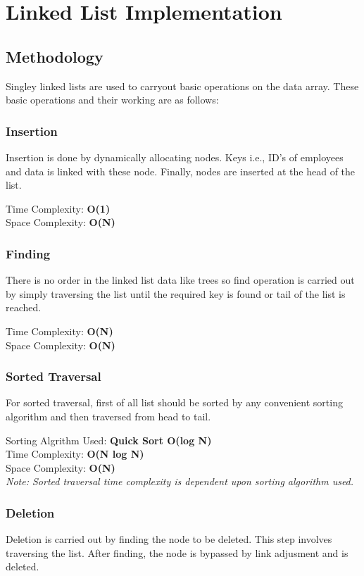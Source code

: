 \chapter{Linked List Implementation} %
\label{Chapter5}
\section{Methodology}
Singley linked lists are used to carryout basic operations on the data array. These basic operations and their working are as follows:

\subsection{Insertion}
Insertion is done by dynamically allocating nodes. Keys i.e., ID's of employees and data is linked with these node. Finally, nodes are inserted at the head of the list.

Time Complexity: \textbf{O(1)} \\
Space Complexity: \textbf{O(N)}

\subsection{Finding}
There is no order in the linked list data like trees so find operation is carried out by simply traversing the list until the required key is found or tail of the list is reached.

Time Complexity: \textbf{O(N)} \\
Space Complexity: \textbf{O(N)}

\subsection{Sorted Traversal}
For sorted traversal, first of all list should be sorted by any convenient sorting algorithm and then traversed from head to tail.

Sorting Algrithm Used: \textbf{Quick Sort O(log N)} \\
Time Complexity: \textbf{O(N log N)}\\ 
Space Complexity: \textbf{O(N)} \\
\textit{Note: Sorted traversal time complexity is dependent upon sorting algorithm used.}\\
\subsection{Deletion}
Deletion is carried out by finding the node to be deleted. This step involves traversing the list. After finding, the node is bypassed by link adjusment and is deleted. 

